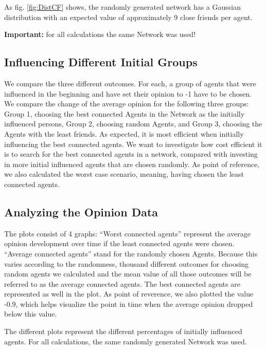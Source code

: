 \documentclass[11pt]{article}
\begin{document}
As fig. \ref{fig:DistCF} shows, the randomly generated network has a Gaussian distribution with an expected value of approximately 9 close friends per agent.

\textbf{Important:} for all calculations the same Network was used!

\subsection{Influencing Different Initial Groups}
We compare the three different outcomes. For each, a group of agents that were influenced in the beginning and have set their opinion to -1 have to be chosen. We compare the change of the average opinion for the following three groups: Group 1, choosing the best connected Agents in the Network as the initially influenced persons, Group 2, choosing random Agents, and Group 3, choosing the Agents with the least friends. As expected, it is most efficient when initially influencing the best connected agents. We want to investigate how cost efficient it is to search for the best connected agents in a network, compared with investing in more initial influenced agents that are chosen randomly. As point of reference, we also calculated the worst case scenario, meaning, having chosen the least connected agents.

\subsection{Analyzing the Opinion Data}

The plots consist of 4 graphs: “Worst connected agents” represent the average opinion development over time if the least connected agents were chosen. “Average connected agents” stand for the randomly chosen Agents. Because this varies according to the randomness, thousand different outcomes for choosing random agents we calculated and the mean value of all those outcomes will be referred to as the average connected agents. The best connected agents are represented as well in the plot. As point of reverence, we also plotted the value -0.9, which helps visualize the point in time when the average opinion dropped below this value.

The different plots represent the different percentages of initially influenced agents. For all calculations, the same randomly generated Network was used.
\end{document}
